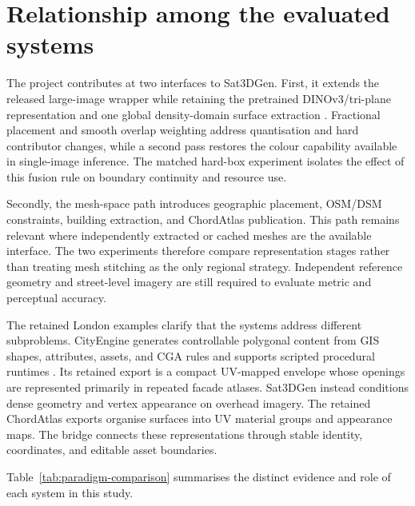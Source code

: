 \section{Relationship among the evaluated systems}

The project contributes at two interfaces to Sat3DGen.  First, it extends the
released large-image wrapper while retaining the pretrained DINOv3/tri-plane
representation and one global density-domain surface extraction
\cite{qian2026sat3dgen,qianSat3DGenCode2026}.  Fractional placement and smooth
overlap weighting address quantisation and hard contributor changes, while a
second pass restores the colour capability available in single-image
inference.  The matched hard-box experiment isolates the effect of this fusion
rule on boundary continuity and resource use.

Secondly, the mesh-space path introduces geographic placement, OSM/DSM
constraints, building extraction, and ChordAtlas publication.  This path
remains relevant where independently extracted or cached meshes are the
available interface.  The two experiments therefore compare representation
stages rather than treating mesh stitching as the only regional strategy.
Independent reference geometry and street-level imagery are still required to
evaluate metric and perceptual accuracy.

The retained London examples clarify that the systems address different
subproblems.  CityEngine generates controllable polygonal content from GIS
shapes, attributes, assets, and CGA rules and supports scripted procedural
runtimes \cite{esriCityEngineIntro2026,esriCityEngineGIS2026,
esriCityEngineSDK2026}.  Its retained export is a compact UV-mapped envelope
whose openings are represented primarily in repeated facade atlases.  Sat3DGen
instead conditions dense geometry and vertex appearance on overhead imagery.
The retained ChordAtlas exports organise surfaces into UV material groups and
appearance maps.  The bridge connects these representations through stable
identity, coordinates, and editable asset boundaries.

Table~\ref{tab:paradigm-comparison} summarises the distinct evidence and role of
each system in this study.

